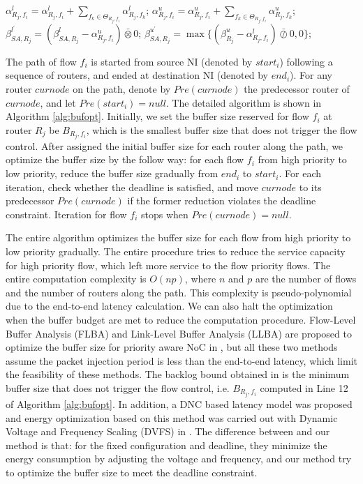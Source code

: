 \documentclass[10pt,journal]{IEEEtran}
\begin{document}
\begin{algorithm}
\begin{algorithmic}[1]
                    \STATE $\alpha^l_{R_j,f_i}=\alpha^l_{R_j,f_i}+\sum_{f_k\in\Theta_{R_j,f_i}}\alpha^l_{R_j,f_k}$;
                    \STATE $\alpha^u_{R_j,f_i}=\alpha^u_{R_j,f_i}+\sum_{f_k\in\Theta_{R_j,f_i}}\alpha^u_{R_j,f_k}$;
                \ENDIF
                \STATE $\beta^{l^\prime}_{SA,R_j}=(\beta^l_{SA,R_j}-\alpha^u_{R_j,f_i})\bar{\otimes}0$;
                \STATE $\beta^{u^\prime}_{SA,R_j}=\max\{(\beta^u_{R_j}-\alpha^l_{R_j,f_i})\bar{\oslash}0,0\}$;
            \ENDIF
        \ENDFOR
    \ENDFOR
\end{algorithmic}
\end{algorithm}

The path of flow $f_i$ is started from source NI (denoted by $start_i$) following a sequence of routers, and ended at destination NI (denoted by $end_i$). For any router $curnode$ on the path, denote by $Pre(curnode)$ the predecessor router of $curnode$, and let $Pre(start_i)=null$. The detailed algorithm is shown in Algorithm \ref{alg:bufopt}. Initially, we set the buffer size reserved for flow $f_i$ at router $R_j$ be $B_{R_j,f_i}$, which is the smallest buffer size that does not trigger the flow control. After assigned the initial buffer size for each router along the path, we optimize the buffer size by the follow way: for each flow $f_i$ from high priority to low priority, reduce the buffer size gradually from $end_i$ to $start_i$. For each iteration, check whether the deadline is satisfied, and move $curnode$ to its predecessor $Pre(curnode)$ if the former reduction violates the deadline constraint. Iteration for flow $f_i$ stops when $Pre(curnode)=null$.

The entire algorithm optimizes the buffer size for each flow from high priority to low priority gradually. The entire procedure tries to reduce the service capacity for high priority flow, which left more service to the flow priority flows. The entire computation complexity is $O(np)$, where $n$ and $p$ are the number of flows and the number of routers along the path. This complexity is pseudo-polynomial due to the end-to-end latency calculation. We can also halt the optimization when the buffer budget are met to reduce the computation procedure. Flow-Level Buffer Analysis (FLBA) and Link-Level Buffer Analysis (LLBA) are proposed to optimize the buffer size for priority aware NoC in \cite{189}, but all these two methods assume the packet injection period is less than the end-to-end latency, which limit the feasibility of these methods. The backlog bound obtained in \cite{189} is the minimum buffer size that does not trigger the flow control, i.e. $B_{R_j,f_i}$ computed in Line 12 of Algorithm \ref{alg:bufopt}. In addition, a DNC based latency model was proposed and energy optimization based on this method was carried out with Dynamic Voltage and Frequency Scaling (DVFS) in \cite{6560630}. The difference between \cite{6560630} and our method is that: for the fixed configuration and deadline, they minimize the energy consumption by adjusting the voltage and frequency, and our method try to optimize the buffer size to meet the deadline constraint.
\end{document}
